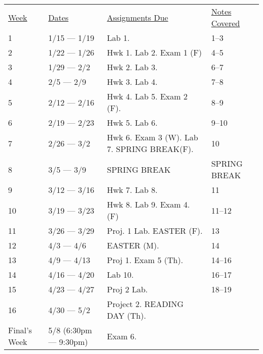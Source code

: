 \documentclass[10pt]{article}
\begin{document}
\begin{center}
\begin{tabular}{llll}
\underline{Week} & \underline{Dates} & \underline{Assignments Due} & \underline{Notes Covered}\\
1 & 1/15 --- 1/19 & Lab 1. & 1--3 \\
2 & 1/22 --- 1/26 & Hwk 1. Lab 2. Exam 1 (F) & 4--5 \\
3 & 1/29 --- 2/2 & Hwk 2. Lab 3.  & 6--7 \\
4 & 2/5 --- 2/9 & Hwk 3. Lab 4. & 7--8 \\
5 & 2/12 --- 2/16 & Hwk 4. Lab 5. Exam 2 (F). & 8--9 \\
6 & 2/19 --- 2/23 & Hwk 5. Lab 6. & 9--10 \\
7 & 2/26 --- 3/2 & Hwk 6.  Exam 3 (W). Lab 7. SPRING BREAK(F).  &  10 \\
8 & 3/5 --- 3/9 & SPRING BREAK & SPRING BREAK \\
9 & 3/12 --- 3/16 & Hwk 7. Lab 8. & 11 \\
10 & 3/19 --- 3/23 & Hwk 8. Lab 9. Exam 4. (F) & 11--12\\
11 & 3/26 --- 3/29 & Proj. 1 Lab. EASTER (F).  & 13 \\
12 & 4/3 --- 4/6 & EASTER (M). & 14 \\
13 & 4/9 --- 4/13 & Proj 1. Exam 5 (Th). & 14--16 \\
14 & 4/16 --- 4/20 & Lab 10. & 16--17 \\
15 & 4/23 --- 4/27 & Proj 2 Lab. & 18--19 \\
16 & 4/30 --- 5/2 & Project 2. READING DAY (Th). & \\
Final's Week & 5/8 (6:30pm --- 9:30pm) & Exam 6. &  \\
\end{tabular}
\end{center}
\end{document}
